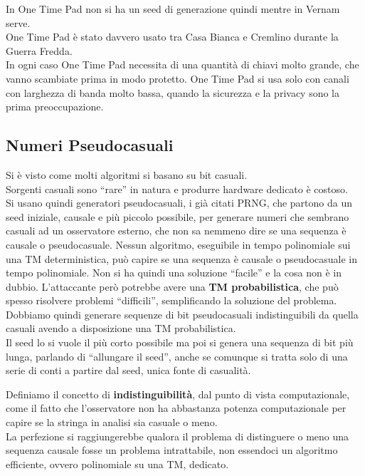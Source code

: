 \documentclass[a4paper,12pt, oneside]{book}
\begin{document}
In One Time Pad non si ha un seed di generazione quindi mentre in Vernam
serve.\\
One Time Pad è stato davvero usato tra Casa Bianca e Cremlino durante la Guerra
Fredda.\\
In ogni caso One Time Pad necessita di una quantità di chiavi molto grande, che
vanno scambiate prima in modo protetto. One Time Pad si usa solo con canali con
larghezza di banda molto bassa, quando la sicurezza e la privacy sono la prima
preoccupazione.
\subsection{Numeri Pseudocasuali}
Si è visto come molti algoritmi si basano su bit casuali. \\
Sorgenti casuali sono ``rare'' in natura e produrre hardware dedicato è
costoso.\\
Si usano quindi generatori pseudocasuali, i già citati PRNG, che partono da un
seed iniziale, causale e più piccolo possibile, per generare numeri che sembrano
casuali ad un osservatore esterno, che non sa nemmeno dire se una sequenza è
causale o pseudocasuale. Nessun algoritmo, eseguibile in tempo polinomiale sui
una TM deterministica, può capire se una sequenza è causale o pseudocasuale in
tempo polinomiale. Non si ha quindi una soluzione ``facile'' e la cosa non è in
dubbio. L'attaccante però potrebbe avere una \textbf{TM probabilistica}, che può
spesso risolvere problemi ``difficili'', semplificando la soluzione del
problema. \\
Dobbiamo quindi generare sequenze di bit pseudocasuali indistinguibili da quella
casuali avendo a disposizione una TM probabilistica.\\
Il seed lo si vuole il più corto possibile ma poi si genera una sequenza di bit
più lunga, parlando di ``allungare il seed'', anche se comunque si tratta solo
di una serie di conti a partire dal seed, unica fonte di casualità.
\begin{definizione}
  Definiamo il concetto di \textbf{indistinguibilità}, dal punto di vista
  computazionale, come il fatto che l'osservatore non ha abbastanza potenza
  computazionale per capire se la stringa in analisi sia casuale o meno. \\
  La perfezione si raggiungerebbe qualora il problema di distinguere o meno una
  sequenza causale fosse un problema intrattabile, non essendoci un algoritmo
  efficiente, ovvero polinomiale su una TM, dedicato.
\end{definizione}
\end{document}
